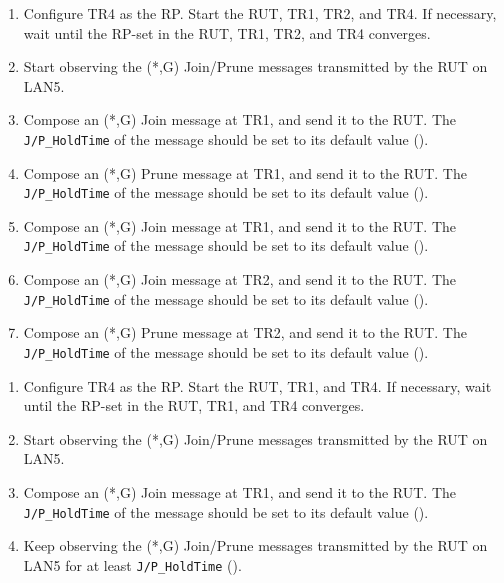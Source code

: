 \documentclass[11pt]{report}
\begin{document}
\begin{enumerate}

  \item Configure TR4 as the RP. Start the RUT, TR1, TR2, and TR4. If
  necessary, wait until the RP-set in the RUT, TR1, TR2, and TR4
  converges.

  \item Start observing the (*,G) Join/Prune messages transmitted by the
  RUT on LAN5.

  \item Compose an (*,G) Join message at TR1, and send it to the RUT. 
  The \verb=J/P_HoldTime= of the message should be set to its default
  value ({\PimsmJPHoldTime}).

  \item Compose an (*,G) Prune message at TR1, and send it to the RUT. 
  The \verb=J/P_HoldTime= of the message should be set to its default
  value ({\PimsmJPHoldTime}).

  \item Compose an (*,G) Join message at TR1, and send it to the RUT. 
  The \verb=J/P_HoldTime= of the message should be set to its default
  value ({\PimsmJPHoldTime}).

  \item Compose an (*,G) Join message at TR2, and send it to the RUT. 
  The \verb=J/P_HoldTime= of the message should be set to its default
  value ({\PimsmJPHoldTime}).

  \item Compose an (*,G) Prune message at TR2, and send it to the RUT. 
  The \verb=J/P_HoldTime= of the message should be set to its default
  value ({\PimsmJPHoldTime}).

\end{enumerate}


\begin{enumerate}

  \item Configure TR4 as the RP. Start the RUT, TR1, and TR4. If
  necessary, wait until the RP-set in the RUT, TR1, and TR4
  converges.

  \item Start observing the (*,G) Join/Prune messages transmitted by the
  RUT on LAN5.

  \item Compose an (*,G) Join message at TR1, and send it to the RUT. 
  The \verb=J/P_HoldTime= of the message should be set to its default
  value ({\PimsmJPHoldTime}).

  \item Keep observing the (*,G) Join/Prune messages transmitted by the
  RUT on LAN5 for at least \verb=J/P_HoldTime= ({\PimsmJPHoldTime}).

\end{enumerate}
\end{document}
